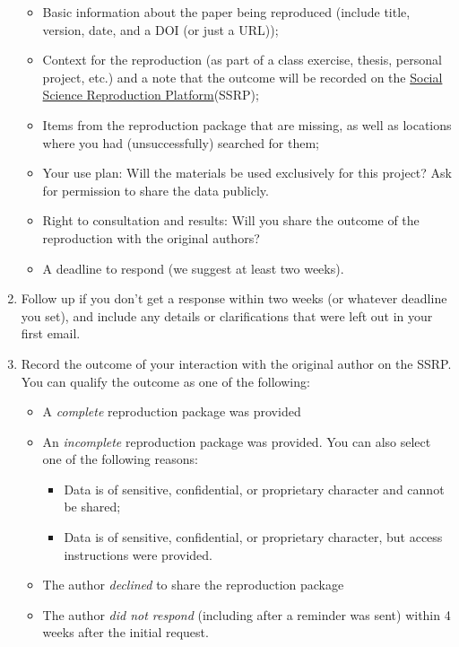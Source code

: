 \documentclass[]{book}
\providecommand{\tightlist}{%
  \setlength{\itemsep}{0pt}\setlength{\parskip}{0pt}}
\begin{document}
\begin{enumerate}
  \begin{itemize}
  \tightlist
  \item
    Basic information about the paper being reproduced (include title, version, date, and a DOI (or just a URL));\\
  \item
    Context for the reproduction (as part of a class exercise, thesis, personal project, etc.) and a note that the outcome will be recorded on the \href{https://www.socialsciencereproduction.org/}{Social Science Reproduction Platform}(SSRP);
  \item
    Items from the reproduction package that are missing, as well as locations where you had (unsuccessfully) searched for them;\\
  \item
    Your use plan: Will the materials be used exclusively for this project? Ask for permission to share the data publicly.\\
  \item
    Right to consultation and results: Will you share the outcome of the reproduction with the original authors?\\
  \item
    A deadline to respond (we suggest at least two weeks).
  \end{itemize}
\item
  Follow up if you don't get a response within two weeks (or whatever deadline you set), and include any details or clarifications that were left out in your first email.
\item
  Record the outcome of your interaction with the original author on the SSRP. You can qualify the outcome as one of the following:

  \begin{itemize}
  \tightlist
  \item
    A \emph{complete} reproduction package was provided
  \item
    An \emph{incomplete} reproduction package was provided. You can also select one of the following reasons:

    \begin{itemize}
    \tightlist
    \item
      Data is of sensitive, confidential, or proprietary character and cannot be shared;
    \item
      Data is of sensitive, confidential, or proprietary character, but access instructions were provided.
    \end{itemize}
  \item
    The author \emph{declined} to share the reproduction package
  \item
    The author \emph{did not respond} (including after a reminder was sent) within 4 weeks after the initial request.
  \end{itemize}
\end{enumerate}
\end{document}
